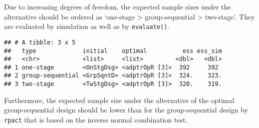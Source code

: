 \documentclass[
]{book}
\newenvironment{Shaded}{\begin{snugshade}}{\end{snugshade}}
\newcommand{\CommentTok}[1]{\textcolor[rgb]{0.56,0.35,0.01}{\textit{#1}}}
\newcommand{\DataTypeTok}[1]{\textcolor[rgb]{0.13,0.29,0.53}{#1}}
\newcommand{\DecValTok}[1]{\textcolor[rgb]{0.00,0.00,0.81}{#1}}
\newcommand{\FloatTok}[1]{\textcolor[rgb]{0.00,0.00,0.81}{#1}}
\newcommand{\KeywordTok}[1]{\textcolor[rgb]{0.13,0.29,0.53}{\textbf{#1}}}
\newcommand{\NormalTok}[1]{#1}
\newcommand{\OperatorTok}[1]{\textcolor[rgb]{0.81,0.36,0.00}{\textbf{#1}}}
\newcommand{\StringTok}[1]{\textcolor[rgb]{0.31,0.60,0.02}{#1}}
\begin{document}
Due to increasing degrees of freedom, the expected sample sizes under the
alternative should be ordered as `one-stage \textgreater{} group-sequential \textgreater{} two-stage'.
They are evaluated by simulation as well as by \texttt{evaluate()}.

\begin{Shaded}
\end{Shaded}

\begin{verbatim}
## # A tibble: 3 x 5
##   type             initial    optimal          ess ess_sim
##   <chr>            <list>     <list>         <dbl>   <dbl>
## 1 one-stage        <OnStgDsg> <adptrOpR [3]>  392     392 
## 2 group-sequential <GrpSqntD> <adptrOpR [3]>  324.    323.
## 3 two-stage        <TwStgDsg> <adptrOpR [3]>  320.    319.
\end{verbatim}

Furthermore, the expected sample size under the alternative of the
optimal group-sequential design should be lower than for the
group-sequential design by \texttt{rpact} that is based on the inverse normal
combination test.
\end{document}
